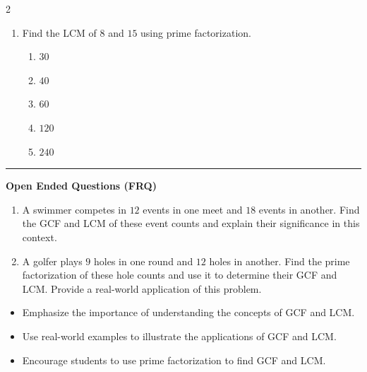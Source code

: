 \documentclass[10pt]{article}
\begin{document}
\begin{multicols}{2}
\begin{enumerate}[label=\textbf{Q\arabic*.}, leftmargin=*, itemsep=6pt, parsep=0pt]
  \item \small Find the LCM of $8$ and $15$ using prime factorization.
  \begin{enumerate}[label=(\Alph*), leftmargin=0.6cm, nosep, itemsep=2pt]
    \item $30$
    \item $40$
    \item $60$
    \item $120$
    \item $240$
  \end{enumerate}

\end{enumerate}
\end{multicols}

\vspace{-0.2cm}
\hrule
\vspace{0.2cm}
\textbf{\small Open Ended Questions (FRQ)}
\begin{enumerate}[label=\textbf{Q\arabic*.}, start=9, itemsep=5pt, topsep=0pt]

  \item \small A swimmer competes in $12$ events in one meet and $18$ events in another. Find the GCF and LCM of these event counts and explain their significance in this context. \vspace{2cm}

  \item \small A golfer plays $9$ holes in one round and $12$ holes in another. Find the prime factorization of these hole counts and use it to determine their GCF and LCM. Provide a real-world application of this problem. \vspace{2cm}

\end{enumerate}

\vfill

\begin{tcolorbox}[colback=blue!5, colframe=mainblue!50, title=\small \textbf{Chef's Tips}, fonttitle=\bfseries, bottom=1mm]
\begin{itemize}[noitemsep, topsep=2pt, leftmargin=0.5cm]
  \item \scriptsize Emphasize the importance of understanding the concepts of GCF and LCM.\item \scriptsize Use real-world examples to illustrate the applications of GCF and LCM.\item \scriptsize Encourage students to use prime factorization to find GCF and LCM.
\end{itemize}
\end{tcolorbox}
\end{document}
